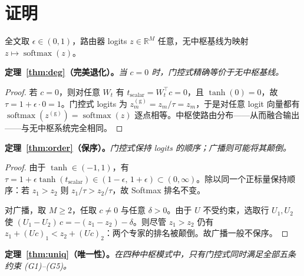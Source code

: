 \documentclass[10pt,twoside]{article}
\newcommand{\softmax}{\operatorname{softmax}}
\newcommand{\R}{\mathbb{R}}
\theoremstyle{definition}
\theoremstyle{plain}
\theoremstyle{remark}
\begin{document}
\section{证明}
\label{app:proofs}

全文取 $\epsilon \in (0,1)$，路由器 logits $z \in \R^M$ 任意，无中枢基线为映射 $z \mapsto \softmax(z)$。

\medskip
\noindent\textbf{定理~\ref{thm:deg}（完美退化）。}\emph{当 $c = 0$ 时，门控式精确等价于无中枢基线。}

\begin{proof}
若 $c = 0$，则对任意 $W_t$ 有 $t_{\text{scalar}} = W_t^\top c = 0$，且 $\tanh(0) = 0$，故 $\tau = 1 + \epsilon \cdot 0 = 1$。门控式 logits 为 $z^{(\text{g})}_m = z_m / \tau = z_m$，于是对任意 logit 向量都有 $\softmax(z^{(\text{g})}) = \softmax(z)$ 逐点相等。中枢使路由分布——从而融合输出——与无中枢系统完全相同。
\end{proof}

\medskip
\noindent\textbf{定理~\ref{thm:order}（保序）。}\emph{门控式保持 logits 的顺序；广播则可能将其颠倒。}

\begin{proof}
由于 $\tanh \in (-1, 1)$，有 $\tau = 1 + \epsilon \tanh(t_{\text{scalar}}) \in (1 - \epsilon,\, 1 + \epsilon) \subset (0, \infty)$。除以同一个正标量保持顺序：若 $z_1 > z_2$ 则 $z_1 / \tau > z_2 / \tau$，故 Softmax 排名不变。

对广播，取 $M \geq 2$，任取 $c \neq 0$ 与任意 $\delta > 0$。由于 $U$ 不受约束，选取行 $U_1, U_2$ 使 $(U_1 - U_2)\,c = -(z_1 - z_2) - \delta$。则尽管 $z_1 > z_2$ 仍有 $z_1 + (Uc)_1 < z_2 + (Uc)_2$：两个专家的排名被颠倒。故广播一般不保序。
\end{proof}

\medskip
\noindent\textbf{定理~\ref{thm:uniq}（唯一性）。}\emph{在四种中枢模式中，只有门控式同时满足全部五条约束 (G1)--(G5)。}
\end{document}
